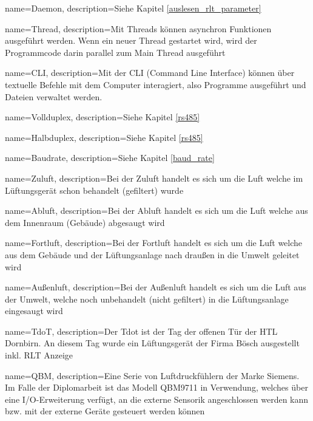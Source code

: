 {
	name=Daemon,
	description={Siehe Kapitel \ref{auslesen_rlt_parameter} }
}

{
	name=Thread,
	description={Mit Threads können asynchron Funktionen ausgeführt werden. Wenn ein neuer Thread gestartet wird, wird der Programmcode darin parallel zum Main Thread ausgeführt}
}

{
	name=CLI,
	description={Mit der CLI (Command Line Interface) können über textuelle Befehle mit dem Computer interagiert, also Programme ausgeführt und Dateien verwaltet werden. \cite[vgl.][]{loshin_gillis:2022}}
}

{
	name=Vollduplex,
	description={Siehe Kapitel \ref{rs485} }
}

{
	name=Halbduplex,
	description={Siehe Kapitel \ref{rs485} }
}

{
	name=Baudrate,
	description={Siehe Kapitel \ref{baud_rate} }
}

{
	name=Zuluft,
	description={Bei der Zuluft handelt es sich um die Luft welche im Lüftungsgerät schon behandelt (gefiltert) wurde}
}

{
	name=Abluft,
	description={Bei der Abluft handelt es sich um die Luft welche aus dem Innenraum (Gebäude) abgesaugt wird}
}

{
	name=Fortluft,
	description={Bei der Fortluft handelt es sich um die Luft welche aus dem Gebäude und der Lüftungsanlage nach draußen in die Umwelt geleitet wird}
}

{
	name=Außenluft,
	description={Bei der Außenluft handelt es sich um die Luft aus der Umwelt, welche noch unbehandelt (nicht gefiltert) in die Lüftungsanlage eingesaugt wird}
}

{
	name=TdoT,
	description={Der Tdot ist der Tag der offenen Tür der HTL Dornbirn. An diesem Tag wurde ein Lüftungsgerät der Firma Bösch ausgestellt inkl. RLT Anzeige}
}

{
	name=QBM,
	description={Eine Serie von Luftdruckfühlern der Marke Siemens. Im Falle der Diplomarbeit ist das Modell QBM9711 in Verwendung, welches über eine I/O-Erweiterung verfügt, an die externe Sensorik angeschlossen werden kann bzw. mit der externe Geräte gesteuert werden können}
}

